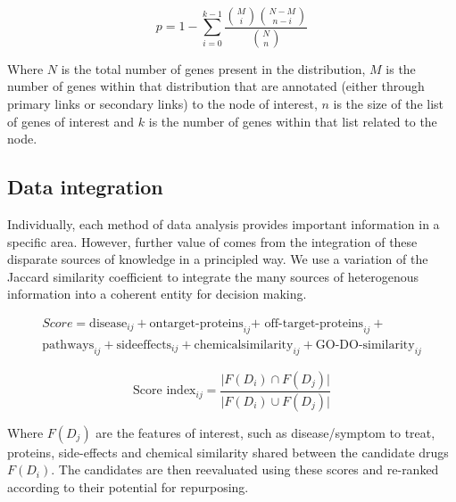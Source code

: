 \documentclass[preprint,12pt]{elsarticle}
\begin{document}
\begin{equation}
        p = 1 - \displaystyle\sum_{i = 0}^{k-1}\frac{{M \choose i}{{N-M} \choose {n-i}}} {{N \choose n}}
\label{doe}
\end{equation}

Where $N$ is the total number of genes present in the distribution, $M$ is the number of genes within that distribution that are annotated (either through primary links or secondary links) to the node of interest, $n$ is the size of the list of genes of interest and $k$ is the number of genes within that list related to the node. 

\subsection{Data integration}
Individually, each method of data analysis  provides important information in a specific area. However, further value of  comes from the integration of these disparate sources of  knowledge in a principled way. We use  a variation of the Jaccard similarity coefficient to integrate the many sources of heterogenous information into a coherent entity for decision making.

\begin{eqnarray}
        Score  = \text{disease}_{ij} + \text{ontarget-proteins}_{ij} \text{+ off-target-proteins}_{ij} + \nonumber \\
        \text{pathways}_{ij} + \text{sideeffects}_{ij} + \text{chemicalsimilarity}_{ij} +\text{GO-DO-similarity}_{ij}
\label{integrate}
\end{eqnarray}

\begin{equation}
        \text{Score index}_{ij} = \frac{\vert F(D_{i}) \cap F(D_j)\vert} {\vert F(D_{i}) \cup F(D_j) \vert}\nonumber
\label{associndex}
\end{equation}

Where $F(D_j)$ are the features of interest, such as disease/symptom to treat, proteins, side-effects and chemical similarity shared between the candidate drugs $F(D_i)$. The candidates are then reevaluated using these scores and re-ranked according to their potential for repurposing.
\end{document}
